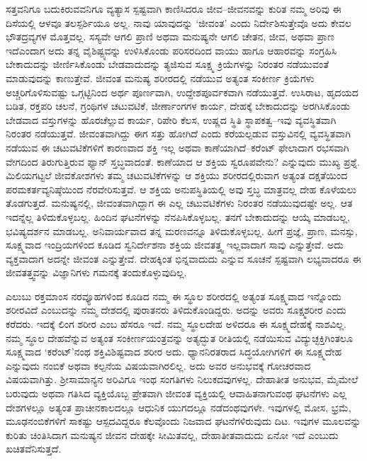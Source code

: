 ಸತ್ತವನಿಗೂ ಬದುಕಿರುವವನಿಗೂ ವ್ಯತ್ಯಾಸ ಸ್ಪಷ್ಟವಾಗಿ ಕಾಣಿಸಿದರೂ ಜೀವ–ಜೀವನವನ್ನು ಕುರಿತ ನಮ್ಮ ಅರಿವು ಈ ದಿಸೆಯಲ್ಲಿ ಆಳವೂ ತಲಸ್ಪರ್ಶಿಯೂ ಅಲ್ಲ. ನಾವು ಯಾವುದನ್ನು ‘ಜೀವಂತ’ ಎಂದು ನಿರ್ದೇಶಿಸುತ್ತೇವೊ ಅದು ಕೇವಲ ಭೌತದ್ರವ್ಯಗಳ ಮೊತ್ತವಲ್ಲ. ಸಸ್ಯವೇ ಆಗಲಿ ಪ್ರಾಣಿ ಅಥವಾ ಮನುಷ್ಯನೇ ಆಗಲಿ ಚೇತನ, ಜೀವ, ಅಥವಾ ಪ್ರಾಣ ಇದೆ\break ಎಂದಾಗ ಅದು ತನ್ನ ವೈಶಿಷ್ಟ್ಯವನ್ನು ಉಳಿಸಿಕೊಂಡು ಪರಿಸರದಿಂದ ವಾಯು ಹಾಗೂ ಆಹಾರವನ್ನು ಸಂಗ್ರಹಿಸಿ ಬೇಕಾದುದನ್ನು ಜೀರ್ಣಿಸಿಕೊಂಡು ಬೇಡವಾದುದನ್ನು ತ್ಯಜಿಸುವ ಸೂಕ್ಷ್ಮ ಕ್ರಿಯೆಗಳನ್ನು ನಿರಂತರ ನಡೆಯುವಂತೆ ಮಾಡುವುದನ್ನು ಕಾಣುತ್ತೇವೆ. ಜೀವಂತ ಮನುಷ್ಯ ಶರೀರದಲ್ಲಿ ನಡೆಯುವ ಅತ್ಯಂತ ಸಂಕೀರ್ಣ ಕ್ರಿಯೆಗಳು ಅಚ್ಚರಿಗೊಳಿಸುವಷ್ಟು ಒಗ್ಗಟ್ಟಿನಿಂದ ಅರ್ಥ ಪೂರ್ಣವಾಗಿ, ಉದ್ದೇಶಪೂರ್ವಕವಾಗಿ ನಡೆಯುತ್ತವೆ. ಉಸಿರಾಟ, ಹೃದಯದ ಬಡಿತ, ರಕ್ತಪರಿ ಚಲನೆ, ಗ್ರಂಥಿಗಳ ಚಟುವಟಿಕೆ, ಜೀರ್ಣಾಂಗಗಳ ಕಾರ್ಯ, ದೇಹಕ್ಕೆ ಬೇಕಾದುದನ್ನು ಅರಗಿಸಿಕೊಂಡು ಬೇಡವಾದ ವಸ್ತುಗಳನ್ನು ಹೊರಚೆಲ್ಲುವ ಕಾರ್ಯ, ರಿಪೇರಿ ಕೆಲಸ, ಉಷ್ಣದ ಸ್ಥಿತಿ ಸ್ಥಾಪಕತ್ವ–ಇವು ವ್ಯವಸ್ಥಿತವಾಗಿ ನಿರಂತರ ನಡೆಯುತ್ತವೆ. ಜೀವಂತವಾಗಿದ್ದು ಈಗ ಸತ್ತು ಹೋಗಿದೆ ಎಂದು ಕರೆಯಲ್ಪಡುವ ವಸ್ತುವಿನಲ್ಲಿ ವ್ಯವಸ್ಥಿತವಾಗಿ ನಡೆಯುವ ಈ ಚಟುವಟಿಕೆಗಳಿಗೆ ಕಾರಣವಾದ ಶಕ್ತಿ ಇಲ್ಲ ಅಥವಾ ಕಾಣೆಯಾಗಿದೆ–ಕರೆಂಟ್ ಫೇಲಾದಾಗ ರಭಸವಾಗಿ ವೇಗದಿಂದ ತಿರುಗುತ್ತಿರುವ ಫ್ಯಾನ್ ಸ್ತಬ್ಧವಾದಂತೆ. ಕಾಣೆಯಾದ ಆ ಶಕ್ತಿಯ ಸ್ವರೂಪವೇನು? ಎನ್ನುವುದು ಮುಖ್ಯ ಪ್ರಶ್ನೆ. ಮಿಲಿಯಗಟ್ಟಲೆ ಜೀವಕೋಶಗಳು ತಮ್ಮ ಚಟುವಟಿಕೆಗಳನ್ನು ಆ ಶಕ್ತಿಯು ಶರೀರದಲ್ಲಿರುವಾಗ ಅತ್ಯಂತ ದಕ್ಷತೆಯಿಂದ ಪರಮಕರ್ತವ್ಯನಿಷ್ಠೆಯಿಂದ ನೆರವೇರಿಸುತ್ತವೆ. ಆ ಶಕ್ತಿಯ ಅನುಪಸ್ಥಿತಿಯಲ್ಲಿ ಅವು ಸ್ತಬ್ಧ ಮಾತ್ರವಲ್ಲ ದೇಹ ಕೊಳೆಯಲು ತೊಡಗುತ್ತದೆ. ಮನುಷ್ಯನಲ್ಲಿ, ಜೀವಂತವಾಗಿದ್ದಾಗ ಈ ಎಲ್ಲ ಚಟುವಟಿಕೆಗಳು ನಿರಂತರ ನಡೆಯುವುದಷ್ಟೇ ಅಲ್ಲ. ಆತ ಇದನ್ನೆಲ್ಲ ತಿಳಿದುಕೊಳ್ಳಬಲ್ಲ. ಹಿಂದಿನ ಘಟನೆಗಳನ್ನು ನೆನಪಿಸಿಕೊಳ್ಳಬಲ್ಲ. ತನಗೆ ಬೇಕಾದುದನ್ನು ಆಯ್ಕೆ ಮಾಡಬಲ್ಲ, ಭವಿಷ್ಯದರ್ಶನ ಮಾಡಬಲ್ಲ. ಅನಿವಾರ್ಯವಾದ ತನ್ನ ಮರಣವನ್ನೂ ತಿಳಿದುಕೊಳ್ಳಬಲ್ಲ. ಹೀಗೆ ಪ್ರಜ್ಞೆ, ಪ್ರಾಣ, ಮನಸ್ಸು, ಸೂಕ್ಷ್ಮವಾದ ಇಂದ್ರಿಯಗಳಿಂದ ಕೂಡಿದ ಸ್ವನಿರ್ದೇಶನಾ ಶಕ್ತಿಯ ಜೀವತತ್ತ್ವ ಇಲ್ಲವಾದಾಗ ಸಾವು ಎನ್ನುತ್ತೇವೆ. ಅದು ವ್ಯಕ್ತವಾದಾಗ ಅದನ್ನೇ ಜೀವಂತ ಎನ್ನುತ್ತೇವೆ. ದೇಹಕ್ಕಿಂತ ಭಿನ್ನವಾದುದು ಎನ್ನುವ ಸೂಚನೆ ಸ್ಪಷ್ಟವಾಗಿ ಲಭ್ಯವಾದರೂ ಈ ಜೀವತತ್ತ್ವವನ್ನು ವಿಜ್ಞಾನಿಗಳು ಗಮನಕ್ಕೆ ತಂದುಕೊಳ್ಳುವುದಿಲ್ಲ.

ಎಲುಬು ರಕ್ತಮಾಂಸ ನರವ್ಯೂಹಗಳಿಂದ ಕೂಡಿದ ನಮ್ಮ ಈ ಸ್ಥೂಲ ಶರೀರದಲ್ಲಿ ಅತ್ಯಂತ ಸೂಕ್ಷ್ಮವಾದ ಇನ್ನೊಂದು ಶರೀರವಿದೆ ಎಂಬುದನ್ನು ನಮ್ಮ ದೇಶದಲ್ಲಿ ಪುರಾತನರು ತಿಳಿದು\-ಕೊಂಡಿದ್ದರು. ಅದನ್ನು ಅವರು ಸೂಕ್ಷ್ಮಶರೀರ ಎಂದು ಕರೆದರು. ಇದಕ್ಕೆ ಲಿಂಗ ಶರೀರ ಎಂಬ ಹೆಸರೂ ಇದೆ. ನಮ್ಮ ಸ್ಥೂಲದೇಹ ಅಳಿದರೂ ಈ ಸೂಕ್ಷ್ಮದೇಹಕ್ಕೆ ನಾಶವಿಲ್ಲ. ನಮ್ಮ ಸ್ಥೂಲ ದೇಹವೆನ್ನುವ ಅತ್ಯಂತ ಸಂಕೀರ್ಣಯಂತ್ರವನ್ನು ಅತ್ಯದ್ಭುತ ರೀತಿಯಲ್ಲಿ ನಡೆಯಿಸುವ ವಿದ್ಯುಚ್ಛಕ್ತಿಗಿಂತಲೂ ಸೂಕ್ಷ್ಮವಾದ ‘ಕರೆಂಟ್​’ನಂಥ ಶಕ್ತಿವಿಶಿಷ್ಟವಾದ ಶರೀರ ಅದು. ಧ್ಯಾನನಿರತರಾದ ಸಿದ್ಧಯೋಗಿಗಳಿಗೆ ಈ ಸೂಕ್ಷ್ಮದೇಹ ಎನ್ನುವುದು ನಂಬಿಕೆ ಅಥವಾ ಕಲ್ಪನೆಯ ವಿಷಯವಾಗಿರಲಿಲ್ಲ. ಅದು ಅವರ ಅನುಭವಕ್ಕೆ ಗೋಚರವಾದ ವಿಷಯವಾಗಿತ್ತು. ಶ‍್ರೀಸಾಮಾನ್ಯನ ಅರಿವಿಗೂ ಇಂಥ ಸಂಗತಿಗಳು ನಿಲುಕದವುಗಳಲ್ಲ. ದೇಹಾತೀತ ಅನುಭವ, ಮೈಮೇಲೆ ಬರುವುದು ಅಥವಾ ಗತಿಸಿದ ವ್ಯಕ್ತಿಯೊಬ್ಬ ಪ್ರೇತವಾಗಿ ಜೀವಂತ ವ್ಯಕ್ತಿಯಲ್ಲಿ ಆವಾಹಿತನಾಗುವಂಥ ಘಟನೆಗಳು ಎಲ್ಲ ದೇಶಗಳಲ್ಲೂ ಅತ್ಯಂತ ಪ್ರಾಚೀನಕಾಲದಲ್ಲೂ ಆಧುನಿಕ ಯುಗದಲ್ಲೂ ನಡೆದಂಥವುಗಳೇ. ಇವುಗಳಲ್ಲಿ ಮೋಸ, ಭ್ರಮೆ, ಮೂಢನಂಬಿಕೆಗಳಿಗೆ ಸಾಕಷ್ಟು ಆಸ್ಪದವಿದ್ದರೂ ಕೆಲವೊಂದು ನಿಜವಾದ ಘಟನೆಗಳಿರುವುದು ದಿಟ. ಇವುಗಳ ಮೂಲವನ್ನು ಕುರಿತು ಚಿಂತಿಸಿದಾಗ ಮನುಷ್ಯನ ಜೀವನ ದೇಹಕ್ಕೇ ಸೀಮಿತವಲ್ಲ, ದೇಹಾತೀತವಾದುದು ಏನೋ ಇದೆ ಎಂಬುದು ಖಚಿತವೆನಿಸುತ್ತದೆ.

